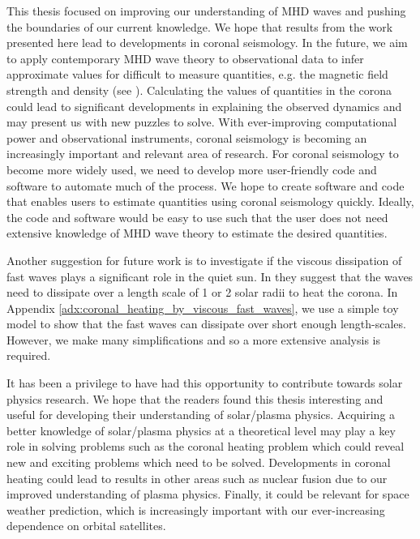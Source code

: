 This thesis focused on improving our understanding of MHD waves and pushing the boundaries of our current knowledge. We hope that results from the work presented here lead to developments in coronal seismology. In the future, we aim to apply contemporary MHD wave theory to observational data to infer approximate values for difficult to measure quantities, e.g. the magnetic field strength and density (see \citealt{Mathioudakis2013}). Calculating the values of quantities in the corona could lead to significant developments in explaining the observed dynamics and may present us with new puzzles to solve. With ever-improving computational power and observational instruments, coronal seismology is becoming an increasingly important and relevant area of research. For coronal seismology to become more widely used, we need to develop more user-friendly code and software to automate much of the process. We hope to create software and code that enables users to estimate quantities using coronal seismology quickly. Ideally, the code and software would be easy to use such that the user does not need extensive knowledge of MHD wave theory to estimate the desired quantities. 

Another suggestion for future work is to investigate if the viscous dissipation of fast waves plays a significant role in the quiet sun. In \citet{Withbroe1977,Parker1991} they suggest that the waves need to dissipate over a length scale of 1 or 2 solar radii to heat the corona. In Appendix \ref{adx:coronal_heating_by_viscous_fast_waves}, we use a simple toy model to show that the fast waves can dissipate over short enough length-scales. However, we make many simplifications and so a more extensive analysis is required. 

It has been a privilege to have had this opportunity to contribute towards solar physics research. We hope that the readers found this thesis interesting and useful for developing their understanding of solar/plasma physics. Acquiring a better knowledge of solar/plasma physics at a theoretical level may play a key role in solving problems such as the coronal heating problem which could reveal new and exciting problems which need to be solved. Developments in coronal heating could lead to results in other areas such as nuclear fusion due to our improved understanding of plasma physics.  Finally, it could be relevant for space weather prediction,  which is increasingly important with our ever-increasing dependence on orbital satellites.